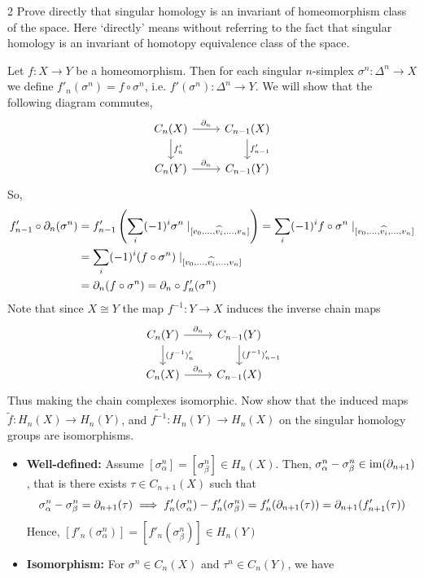 \documentclass[12pt]{article}
\begin{document}
\newpage

\begin{problem} {2}
    Prove directly that singular homology is an invariant of homeomorphism class of the space. Here `directly' means without referring to the fact that singular homology is an invariant of homotopy equivalence class of the space.
\end{problem}

\begin{solution}
    \bbni

    Let $f: X \to Y$ be a homeomorphism. Then for each singular $n$-simplex $\sigma^n: \Delta^n \to X$ we define $f'_n(\sigma^n) = f \circ \sigma^n$, i.e. $f'(\sigma^n): \Delta^n \to Y$. We will show that the following diagram commutes,
    \[\begin{tikzcd}
        C_n(X) \ar[r, "\d_n"]  \ar[d, "f'_{n}"] & C_{n-1}(X)  \ar[d, "f'_{n-1}"]\\ 
        C_n(Y) \ar[r, "\d_n"] & C_{n-1}(Y)  
    \end{tikzcd}\]
    So, 
    \begin{align*}
        f_{n-1}' \circ \partial_{n} (\sigma^n) &= f_{n-1}' \left(\sum_i (-1)^i \sigma^n  \mid_{[v_0, \ldots, \widehat{v_i}, \ldots, v_n]} \right) = \sum_i (-1)^i f \circ \sigma^n  \mid_{[v_0, \ldots, \widehat{v_i}, \ldots, v_n]} \\ 
        &= \sum_i (-1)^i (f \circ \sigma^n) \mid_{[v_0, \ldots, \widehat{v_i}, \ldots, v_n]} \\ 
        &= \partial_n(f \circ \sigma^n) = \partial_n \circ f_n' (\sigma^n )
    \end{align*}
    Note that since $X \cong Y$ the map $f^{-1}: Y \to X$ induces the inverse chain maps
     \[\begin{tikzcd}
        C_n(Y) \ar[r, "\d_n"]  \ar[d, "(f^{-1})'_{n}"] & C_{n-1}(Y)  \ar[d, "(f^{-1})'_{n-1}"]\\ 
        C_n(X) \ar[r, "\d_n"] & C_{n-1}(X)  
    \end{tikzcd}\]
    Thus making the chain complexes isomorphic. Now show that the induced maps $\widetilde{f}: H_n(X) \to H_n(Y)$, and $\widetilde{f^{-1}}: H_n(Y) \to H_n(X)$ on the singular homology groups are isomorphisms. 
    \begin{itemize}
        \item \textbf{Well-defined:} Assume $[\sigma^n_\alpha] = [\sigma_\beta^n] \in H_n(X)$. Then, $\sigma^n_\alpha - \sigma_\beta^n \in \operatorname{im}(\partial_{n+1})$, that is there exists $\tau \in C_{n+1}(X)$ such that 
        \[\sigma^n_\alpha - \sigma_\beta^n = \partial_{n+1}(\tau) \implies f'_n(\sigma_\alpha^n) - f'_n(\sigma_\beta^n) = f_n'(\partial_{n+1}(\tau)) = \partial_{n+1}(f'_{n+1}(\tau))\]
        Hence, $[f'_n(\sigma_\alpha^n)] = [f'_n(\sigma^n_\beta)] \in H_n(Y)$
        \item \textbf{Isomorphism:} For $\sigma^n \in C_n(X)$ and $\tau^n \in C_n(Y)$, we have
        

\end{itemize}
\end{solution}
\end{document}
